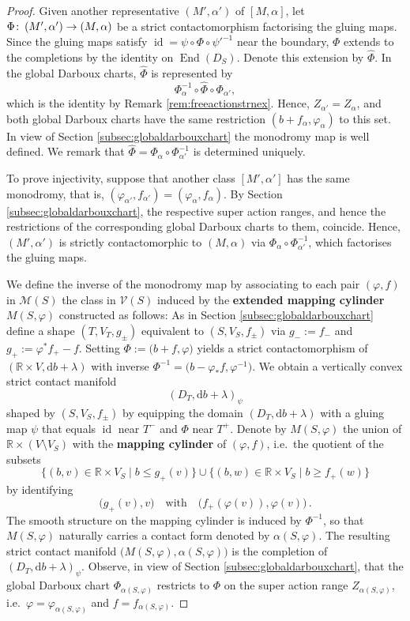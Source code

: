 \documentclass{amsart}
\theoremstyle{definition}
\def\co{\colon\thinspace}
\newcommand{\rmd}{\mathrm d}
\newcommand{\MM}{\mathcal M}
\newcommand{\R}{\mathbb R}
\newcommand{\VV}{\mathcal V}
\newcommand{\ra}{\rightarrow}
\DeclareMathOperator{\End}{\mathrm{End}}
\DeclareMathOperator{\id}{\mathrm{id}}
\begin{document}
\begin{proof}
Given another representative $(M',\alpha')$ of $[M,\alpha]$,
let $\Phi\co(M',\alpha')\ra(M,\alpha)$
be a strict contactomorphism factorising the gluing maps.
Since the gluing maps satisfy
$\id=\psi\circ\Phi\circ\psi'^{-1}$
near the boundary,
$\Phi$ extends to the completions
by the identity on $\End(D_S)$.
Denote this extension by $\hat{\Phi}$.
In the global Darboux charts,
$\hat{\Phi}$ is represented by
\[
\Phi_{\alpha}^{-1}\circ\hat{\Phi}\circ\Phi_{\alpha'},
\]
which is the identity by
Remark \ref{rem:freeactionstrnex}.
Hence,
$Z_{\alpha'}=Z_{\alpha}$,
and both global Darboux charts have the same restriction
$(b+f_{\alpha},\varphi_{\alpha})$ to this set.
In view of Section \ref{subsec:globaldarbouxchart}
the monodromy map is well defined.
We remark that
$\hat{\Phi}=\Phi_{\alpha}\circ\Phi_{\alpha'}^{-1}$
is determined uniquely.

To prove injectivity, suppose that another class
$[M',\alpha']$ has the same monodromy, that is,
$(\varphi_{\alpha'},f_{\alpha'})=(\varphi_{\alpha},f_{\alpha})$.
By Section \ref{subsec:globaldarbouxchart},
the respective super action ranges,
and hence the restrictions of the corresponding
global Darboux charts to them,
coincide.
Hence,
$(M',\alpha')$ is strictly contactomorphic to $(M,\alpha)$
via $\Phi_{\alpha}\circ\Phi_{\alpha'}^{-1}$,
which factorises the gluing maps.
  
  We define the inverse of the monodromy map
  by associating to each pair $(\varphi,f)$ in $\MM(S)$
  the class in $\VV(S)$ induced by the
  {\bf extended mapping cylinder} $M(S,\varphi)$
  constructed as follows: 
  As in Section \ref{subsec:globaldarbouxchart}
  define a shape $(T,V_T,g_{\pm})$ equivalent to $(S,V_S,f_{\pm})$
  via $g_-:=f_-$ and $g_+:=\varphi^*f_+-f$.
  Setting $\Phi:=\big(b+f,\varphi\big)$
  yields a strict contactomorphism
  of $(\R\times V,\rmd b+\lambda)$ with inverse
  $\Phi^{-1}=\big(b-\varphi_*f,\varphi^{-1}\big)$.
  We obtain a vertically convex strict contact manifold
  \[
  (D_T,\rmd b+\lambda)_{\psi}
  \]
  shaped by $(S,V_S,f_{\pm})$
  by equipping the domain $(D_T,\rmd b+\lambda)$
  with a gluing map $\psi$
  that equals $\id$ near $T^-$ and $\Phi$ near $T^+$.
  Denote by $M(S,\varphi)$ the union of
  $\R\times(V\setminus V_S)$
  with the {\bf mapping cylinder} of $(\varphi,f)$,
  i.e.\ the quotient of the subsets
  \[
  \big\{(b,v)\in\R\times V_S\mid b\leq g_+(v)\big\}
  \cup
  \big\{(b,w)\in\R\times V_S\mid b\geq f_+(w)\big\}
  \]
  by identifying
  \[
  \big(g_+(v),v\big)
  \quad\text{with}\quad
  \big(f_+(\varphi(v)),\varphi(v)\big)
  \,.
  \]
  The smooth structure on the mapping cylinder
  is induced by $\Phi^{-1}$,
  so that $M(S,\varphi)$ naturally carries a contact form
  denoted by $\alpha(S,\varphi)$.
  The resulting strict contact manifold
  $\big(M(S,\varphi),\alpha(S,\varphi)\big)$
  is the completion of $(D_T,\rmd b+\lambda)_{\psi}$.
  Observe, in view of Section \ref{subsec:globaldarbouxchart},
  that the global Darboux chart
  $\Phi_{\alpha(S,\varphi)}$ restricts to $\Phi$
  on the super action range $Z_{\alpha(S,\varphi)}$,
  i.e.\ $\varphi=\varphi_{\alpha(S,\varphi)}$ and $f=f_{\alpha(S,\varphi)}$.
\end{proof}
\end{document}
